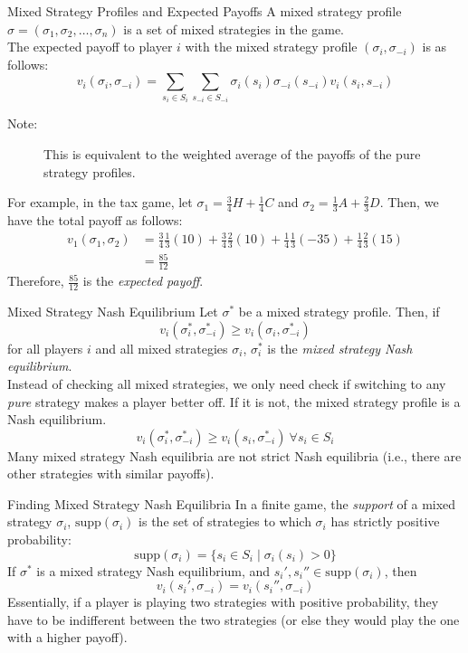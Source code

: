 \documentclass[10pt]{extarticle}
\begin{document}
  \begin{problem}{Mixed Strategy Profiles and Expected Payoffs}
    A mixed strategy profile $\sigma = (\sigma_1,\sigma_2,\dots,\sigma_n)$ is a set of mixed strategies in the game.\\

    The expected payoff to player $i$ with the mixed strategy profile $(\sigma_i, \sigma_{-i})$ is as follows:
    \[
      v_i(\sigma_i,\sigma_{-i}) = \sum_{s_i\in S_i}\sum_{s_{-i}\in S_{-i}}\sigma_i(s_i)\sigma_{-i}(s_{-i})v_i(s_i,s_{-i})
    \] 
    \begin{description}
      \item[Note:] This is equivalent to the weighted average of the payoffs of the pure strategy profiles.
    \end{description}
    For example, in the tax game, let $\sigma_1 = \frac{3}{4}H + \frac{1}{4}C$ and $\sigma_2 = \frac{1}{3}A + \frac{2}{3}D$. Then, we have the total payoff as follows:
    \begin{align*}
      v_1(\sigma_1,\sigma_2) &= \frac{3}{4}\frac{1}{3}(10) + \frac{3}{4}\frac{2}{3}(10) + \frac{1}{4}\frac{1}{3}(-35) + \frac{1}{4}\frac{2}{3}(15)\\
                             &= \frac{85}{12}
    \end{align*}
    Therefore, $\frac{85}{12}$ is the \textit{expected payoff}.
  \end{problem}
  \begin{problem}{Mixed Strategy Nash Equilibrium}
    Let $\sigma^*$ be a mixed strategy profile. Then, if
    \[
      v_i(\sigma^*_i,\sigma^*_{-i}) \geq v_i(\sigma_i,\sigma^*_{-i})
    \] 
    for all players $i$ and all mixed strategies $\sigma_i$, $\sigma^*_i$ is the \textit{mixed strategy Nash equilibrium}.\\

    Instead of checking all mixed strategies, we only need check if switching to any \textit{pure} strategy makes a player better off. If it is not, the mixed strategy profile is a Nash equilibrium.
    \[
      v_i(\sigma^*_i,\sigma^*_{-i}) \geq v_i(s_i,\sigma^*_{-i})~\forall s_i\in S_i
    \] 
    Many mixed strategy Nash equilibria are not strict Nash equilibria (i.e., there are other strategies with similar payoffs).
  \end{problem}
  \begin{problem}{Finding Mixed Strategy Nash Equilibria}
    In a finite game, the \textit{support} of a mixed strategy $\sigma_i$, $\text{supp}(\sigma_i)$ is the set of strategies to which $\sigma_i$ has strictly positive probability:
    \[
      \text{supp}(\sigma_i) = \{s_i\in S_i \mid \sigma_i(s_i) > 0\}
    \]
    If $\sigma^*$ is a mixed strategy Nash equilibrium, and $s_i',s_i'' \in \text{supp}(\sigma_i)$, then
    \[
      v_i(s_i',\sigma_{-i}) = v_i(s_i'',\sigma_{-i})
    \] 
    Essentially, if a player is playing two strategies with positive probability, they have to be indifferent between the two strategies (or else they would play the one with a higher payoff).
  \end{problem}
\end{document}
